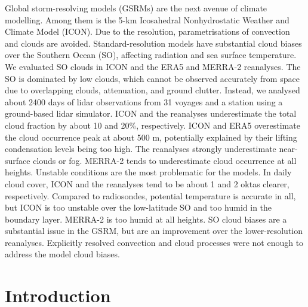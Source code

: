 \documentclass[12pt,a4paper]{article}
\begin{document}
Global storm-resolving models (GSRMs) are the next avenue of climate modelling.
Among them is the 5-km Icosahedral Nonhydrostatic Weather and Climate Model
(ICON). Due to the resolution, parametrisations of convection and clouds are
avoided. Standard-resolution models have substantial cloud biases over the
Southern Ocean (SO), affecting radiation and sea surface temperature.  We
evaluated SO clouds in ICON and the ERA5 and MERRA-2 reanalyses.  The SO is
dominated by low clouds, which cannot be observed accurately from space due to
overlapping clouds, attenuation, and ground clutter.  Instead, we analysed
about 2400 days of lidar observations from 31 voyages and a station using a
ground-based lidar simulator.  ICON and the reanalyses underestimate the total
cloud fraction by about 10 and 20\%, respectively. ICON and ERA5 overestimate
the cloud occurrence peak at about 500 m, potentially explained by their
lifting condensation levels being too high.  The reanalyses strongly
underestimate near-surface clouds or fog.  MERRA-2 tends to underestimate cloud
occurrence at all heights. Unstable conditions are the most problematic for the
models. In daily cloud cover, ICON and the reanalyses tend to be about 1 and 2
oktas clearer, respectively. Compared to radiosondes, potential temperature is
accurate in all, but ICON is too unstable over the low-latitude SO and too humid in
the boundary layer. MERRA-2 is too humid at all heights. SO cloud biases are a
substantial issue in the GSRM, but are an improvement over the
lower-resolution reanalyses. Explicitly resolved convection and cloud processes
were not enough to address the model cloud biases.

\section{Introduction}
\label{sec:introduction}
\end{document}
